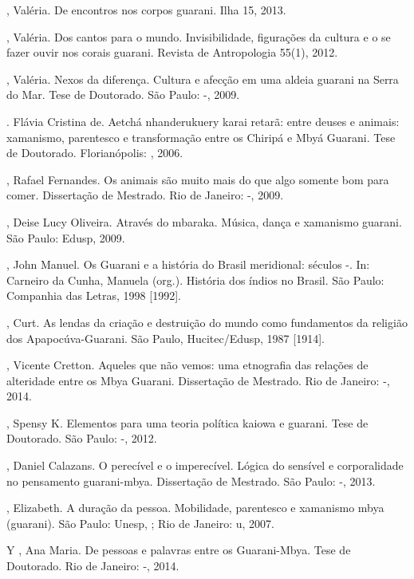\begin{Parskip}
, Valéria. De encontros nos corpos guarani. Ilha 15, 2013.

, Valéria. Dos cantos para o mundo. Invisibilidade, figurações da
cultura e o se fazer ouvir nos corais guarani. Revista de Antropologia
55(1), 2012.

, Valéria. Nexos da diferença. Cultura e afecção em uma aldeia
guarani na Serra do Mar. Tese de Doutorado. São Paulo: -, 2009.

. Flávia Cristina de. Aetchá nhanderukuery karai retarã: entre
deuses e animais: xamanismo, parentesco e transformação entre os
Chiripá e Mbyá Guarani. Tese de Doutorado. Florianópolis: , 2006.

 , Rafael Fernandes. Os animais são muito mais do que algo
somente bom para comer. Dissertação de Mestrado. Rio de Janeiro:
-, 2009.

, Deise Lucy Oliveira. Através do mbaraka. Música, dança e
xamanismo guarani. São Paulo: Edusp, 2009.

, John Manuel. Os Guarani e a história do Brasil meridional:
séculos -. In: Carneiro da Cunha, Manuela (org.). História dos
índios no Brasil. São Paulo: Companhia das Letras, 1998 [1992].

, Curt. As lendas da criação e destruição do mundo como
fundamentos da religião dos Apapocúva-Guarani. São Paulo,
Hucitec/Edusp, 1987 [1914].

, Vicente Cretton. Aqueles que não vemos: uma etnografia das
relações de alteridade entre os Mbya Guarani. Dissertação de Mestrado.
Rio de Janeiro: -, 2014.

, Spensy K. Elementos para uma teoria política kaiowa e guarani.
Tese de Doutorado. São Paulo: -, 2012.

, Daniel Calazans. O perecível e o imperecível. Lógica do sensível
e corporalidade no pensamento guarani-mbya. Dissertação de Mestrado.
São Paulo: -, 2013.

, Elizabeth. A duração da pessoa. Mobilidade, parentesco e
xamanismo mbya (guarani). São Paulo: Unesp, ; Rio de Janeiro: u,
2007.

 Y , Ana Maria. De pessoas e palavras entre os Guarani-Mbya.
Tese de Doutorado. Rio de Janeiro: -, 2014.


\end{Parskip}

